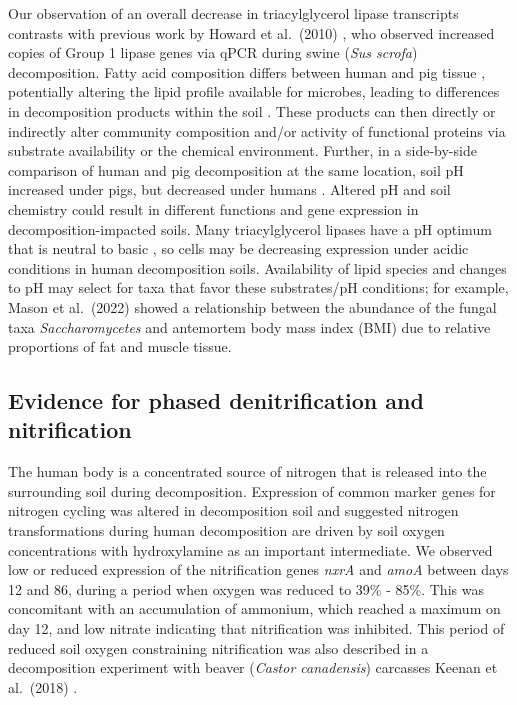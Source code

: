 \documentclass[
  sn-nature,
  lineno, referee]{sn-jnl}
\begin{document}
Our observation of an overall decrease in triacylglycerol lipase
transcripts contrasts with previous work by Howard et al.~(2010)
\citep{howard_characterization_2010}, who observed increased copies of
Group 1 lipase genes via qPCR during swine (\emph{Sus scrofa})
decomposition. Fatty acid composition differs between human and pig
tissue \citep{notter_initial_2009}, potentially altering the lipid
profile available for microbes, leading to differences in decomposition
products within the soil \citep{debruyn_comparative_2021}. These
products can then directly or indirectly alter community composition
and/or activity of functional proteins via substrate availability or the
chemical environment. Further, in a side-by-side comparison of human and
pig decomposition at the same location, soil pH increased under pigs,
but decreased under humans \citep{debruyn_comparative_2021}. Altered pH
and soil chemistry could result in different functions and gene
expression in decomposition-impacted soils. Many triacylglycerol lipases
have a pH optimum that is neutral to basic
\citep{kok_characterization_1995, hasan_influence_2006, zouaoui_production_2012},
so cells may be decreasing expression under acidic conditions in human
decomposition soils. Availability of lipid species and changes to pH may
select for taxa that favor these substrates/pH conditions; for example,
Mason et al.~(2022) \citep{mason_body_2022} showed a relationship
between the abundance of the fungal taxa \emph{Saccharomycetes} and
antemortem body mass index (BMI) due to relative proportions of fat and
muscle tissue.

\subsection{Evidence for phased denitrification and
nitrification}\label{evidence-for-phased-denitrification-and-nitrification}

The human body is a concentrated source of nitrogen that is released
into the surrounding soil during decomposition. Expression of common
marker genes for nitrogen cycling was altered in decomposition soil and
suggested nitrogen transformations during human decomposition are driven
by soil oxygen concentrations with hydroxylamine as an important
intermediate. We observed low or reduced expression of the nitrification
genes \emph{nxrA} and \emph{amoA} between days 12 and 86, during a
period when oxygen was reduced to 39\% - 85\%. This was concomitant with
an accumulation of ammonium, which reached a maximum on day 12, and low
nitrate indicating that nitrification was inhibited. This period of
reduced soil oxygen constraining nitrification was also described in a
decomposition experiment with beaver (\emph{Castor canadensis})
carcasses Keenan et al.~(2018) \citep{keenan_mortality_2018}.
\end{document}
